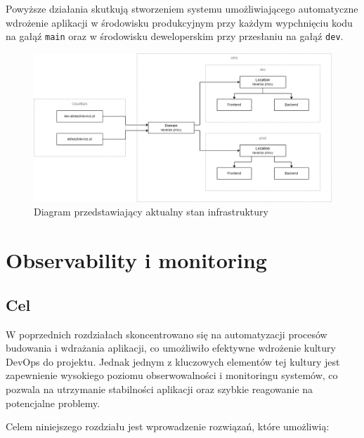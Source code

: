 \documentclass{article}
\begin{document}
Powyższe działania skutkują stworzeniem systemu umożliwiającego automatyczne wdrożenie aplikacji w środowisku produkcyjnym przy każdym wypchnięciu kodu na gałąź \lstinline|main| oraz w środowisku deweloperskim przy przesłaniu na gałąź \lstinline|dev|.

\begin{figure}[H]
    \centering
    \includegraphics[width=1\linewidth]{diagramInfrasturkturaPolowaPracy.png}
    \caption{Diagram przedstawiający aktualny stan infrastruktury}
    \label{fig:enter-label}
\end{figure}


\section{Observability i monitoring}
\subsection{Cel}

W poprzednich rozdziałach skoncentrowano się na automatyzacji procesów budowania i wdrażania aplikacji, co umożliwiło efektywne wdrożenie kultury DevOps do projektu. Jednak jednym z kluczowych elementów tej kultury jest zapewnienie wysokiego poziomu obserwowalności i monitoringu systemów, co pozwala na utrzymanie stabilności aplikacji oraz szybkie reagowanie na potencjalne problemy.

Celem niniejszego rozdziału jest wprowadzenie rozwiązań, które umożliwią:
\end{document}
